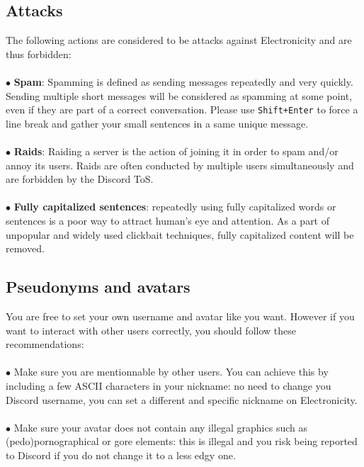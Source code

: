 \documentclass[a4paper]{article}
\begin{document}
\subsection{Attacks}
The following actions are considered to be attacks against Electronicity and are thus forbidden:\\\\
$\bullet$ \textbf{Spam}: Spamming is defined as sending messages repeatedly and very quickly. Sending multiple short messages will be considered as spamming at some point, even if they are part of a correct conversation. Please use \texttt{Shift+Enter} to force a line break and gather your small sentences in a same unique message.\\\\
$\bullet$ \textbf{Raids}: Raiding a server is the action of joining it in order to spam and/or annoy its users. Raids are often conducted by multiple users simultaneously and are forbidden by the Discord ToS.\\\\
$\bullet$ \textbf{Fully capitalized sentences}: repeatedly using fully capitalized words or sentences is a poor way to attract human's eye and attention. As a part of unpopular and widely used clickbait techniques, fully capitalized content will be removed.

\subsection{Pseudonyms and avatars}
You are free to set your own username and avatar like you want. However if you want to interact with other users correctly, you should follow these recommendations:\\\\
$\bullet$ Make sure you are mentionnable by other users. You can achieve this by including a few ASCII characters in your nickname: no need to change you Discord username, you can set a different and specific nickname on Electronicity.\\\\
$\bullet$ Make sure your avatar does not contain any illegal graphics such as (pedo)pornographical or gore elements: this is illegal and you risk being reported to Discord if you do not change it to a less edgy one.
\end{document}
